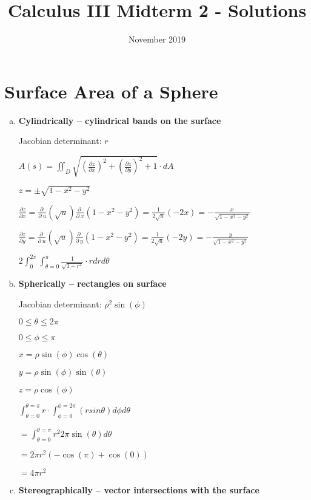\documentclass{article}
\title{Calculus III Midterm 2 - Solutions}
\date{November 2019}
\begin{document}
\maketitle

\section{Surface Area of a Sphere}
\begin{enumerate}[a.]
	\item \textbf{Cylindrically -- cylindrical bands on the surface }

            Jacobian determinant: $ r $

            $ A(s) = \iint_{D}\sqrt{ (\frac{\partial z}{\partial x})^2 + (\frac{\partial z}{\partial y})^2 + 1 } \cdot dA $

            $ z = \pm\sqrt{1-x^{2}-y^{2}} $

            $ \frac{\partial z}{\partial x} = \frac{\partial \:}{\partial \:u}\left(\sqrt{u}\right)\frac{\partial \:}{\partial \:x}\left(1-x^2-y^2\right) = \frac{1}{2\sqrt{u}}\left(-2x\right) = -\frac{x}{\sqrt{1-x^2-y^2}} $

            $ \frac{\partial z}{\partial y} = \frac{\partial \:}{\partial \:u}\left(\sqrt{u}\right)\frac{\partial \:}{\partial \:y}\left(1-x^2-y^2\right) = \frac{1}{2\sqrt{u}}\left(-2y\right) = -\frac{y}{\sqrt{1-x^2-y^2}} $

            $ 2\int_{0}^{2\pi}\int_{\theta=0}^{\pi} \frac{1}{\sqrt{1-r^2}}\cdot r dr d\theta  $

	\item \textbf{Spherically -- rectangles on surface}

            Jacobian determinant: $ \rho^2\sin(\phi) $

            $ 0 \leq \theta \leq 2\pi  $

            $ 0 \leq \phi \leq \pi  $

            $ x = \rho\sin(\phi)\cos(\theta)  $

            $ y = \rho\sin(\phi)\sin(\theta)  $

            $ z = \rho\cos(\phi)  $

            $\int_{\theta=0}^{\theta=\pi}r\cdot\int_{\phi=0}^{\phi=2\pi} (r sin \theta) d\phi d\theta $

            $= \int_{\theta=0}^{\theta=\pi}r^2 2\pi \sin(\theta)d\theta $

            $=  2\pi r^2 (-\cos(\pi)+\cos(0)) $

            $= 4\pi r^2$

	\item \textbf{Stereographically -- vector intersections with the surface}
\end{enumerate}
\end{document}
